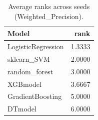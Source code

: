 \begin{table}[t]
\centering
\begin{tabular}{lr}
\toprule
Model & rank \\
\midrule
LogisticRegression & 1.3333 \\
sklearn_SVM & 2.0000 \\
random_forest & 3.0000 \\
XGBmodel & 3.6667 \\
GradientBoosting & 5.0000 \\
DTmodel & 6.0000 \\
\bottomrule
\end{tabular}
\caption{Average ranks across seeds (Weighted_Precision).}
\label{tab:avg_rank_Weighted_Precision}
\end{table}